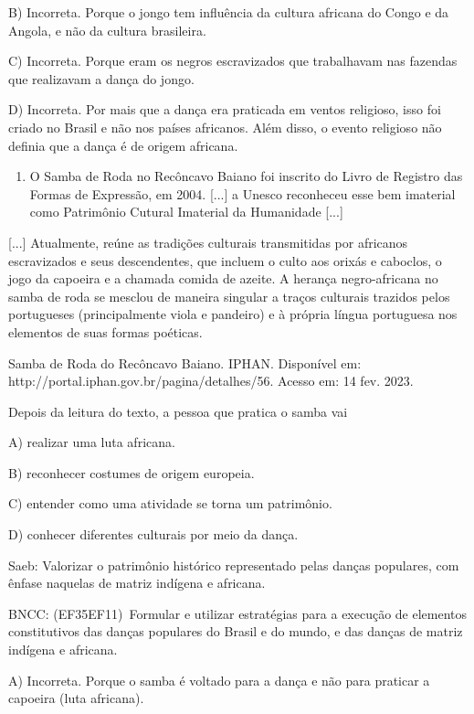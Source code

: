 B) Incorreta. Porque o jongo tem influência da cultura africana do Congo
e da Angola, e não da cultura brasileira.

C) Incorreta. Porque eram os negros escravizados que trabalhavam nas
fazendas que realizavam a dança do jongo.

D) Incorreta. Por mais que a dança era praticada em ventos religioso,
isso foi criado no Brasil e não nos países africanos. Além disso, o
evento religioso não definia que a dança é de origem africana.

\begin{enumerate}
\def\labelenumi{\arabic{enumi}.}
\item
  O Samba de Roda no Recôncavo Baiano foi inscrito do Livro de Registro
  das Formas de Expressão, em 2004. {[}...{]} a Unesco reconheceu esse
  bem imaterial como Patrimônio Cutural Imaterial da Humanidade
  {[}...{]}
\end{enumerate}

{[}...{]} Atualmente, reúne as tradições culturais transmitidas por
africanos escravizados e seus descendentes, que incluem o culto aos
orixás e caboclos, o jogo da capoeira e a chamada comida de azeite. A
herança negro-africana no samba de roda se mesclou de maneira singular a
traços culturais trazidos pelos portugueses (principalmente viola e
pandeiro) e à própria língua portuguesa nos elementos de suas formas
poéticas.~

Samba de Roda do Recôncavo Baiano. IPHAN. Disponível em:
http://portal.iphan.gov.br/pagina/detalhes/56. Acesso em: 14 fev. 2023.

Depois da leitura do texto, a pessoa que pratica o samba vai

A) realizar uma luta africana.

B) reconhecer costumes de origem europeia.

C) entender como uma atividade se torna um patrimônio.

D) conhecer diferentes culturais por meio da dança.

Saeb: Valorizar o patrimônio histórico representado pelas danças
populares, com ênfase naquelas de matriz indígena e africana.

BNCC: (EF35EF11)~Formular e utilizar estratégias para a execução de
elementos constitutivos das danças populares do Brasil e do mundo, e das
danças de matriz indígena e africana.

A) Incorreta. Porque o samba é voltado para a dança e não para praticar
a capoeira (luta africana).

